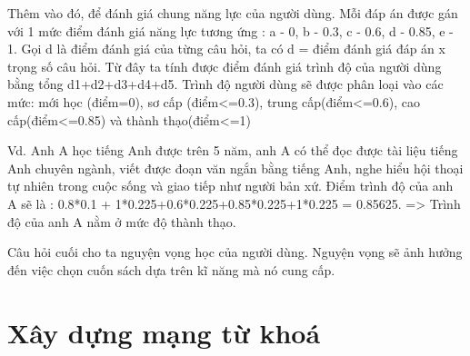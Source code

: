 Thêm vào đó, để đánh giá chung năng lực của người dùng. Mỗi đáp án được gán với 1 mức điểm đánh giá năng lực tương ứng : a - 0, b - 0.3, c - 0.6, d - 0.85, e - 1. Gọi d là điểm đánh giá của từng câu hỏi, ta có d = điểm đánh giá đáp án x trọng số câu hỏi. Từ đây ta tính được điểm đánh giá trình độ của người dùng bằng tổng d1+d2+d3+d4+d5. Trình độ người dùng sẽ được phân loại vào các mức: mới học (điểm=0), sơ cấp (điểm<=0.3), trung cấp(điểm<=0.6), cao cấp(điểm<=0.85) và thành thạo(điểm<=1)

Vd. Anh A học tiếng Anh được trên 5 năm, anh A có thể đọc được tài liệu tiếng Anh chuyên ngành, viết được đoạn văn ngắn bằng tiếng Anh, nghe hiểu hội thoại tự nhiên trong cuộc sống và giao tiếp như người bản xứ. Điểm trình độ của anh A sẽ là : 0.8*0.1 + 1*0.225+0.6*0.225+0.85*0.225+1*0.225 = 0.85625. => Trình độ của anh A nằm ở mức độ thành thạo.

Câu hỏi cuối cho ta nguyện vọng học của người dùng. Nguyện vọng sẽ ảnh hưởng đến việc chọn cuốn sách dựa trên kĩ năng mà nó cung cấp.
\section{Xây dựng mạng từ khoá}



